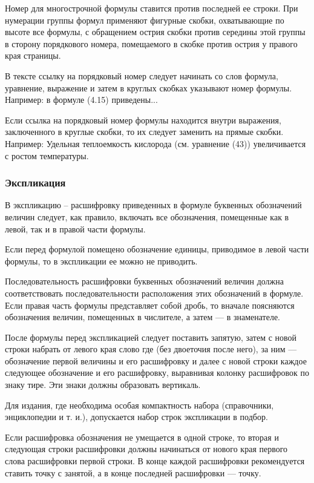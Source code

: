Номер для многострочной формулы ставится против последней ее строки. При нумерации группы формул применяют фигурные скобки, охваты­вающие по высоте все формулы, с обращением острия скобки против середины этой группы в сторону порядкового номера, помещаемого в скобке против острия у правого края страницы. 

В тексте ссылку на порядковый номер следует начинать со слов фор­мула, уравнение, выражение и затем в круглых скобках указывают номер формулы. Например: в формуле (4.15) приведены...

Если ссылка на порядковый номер формулы находится внутри выра­жения, заключенного в круглые скобки, то их следует заменить на прямые скобки. Например: Удельная теплоемкость кислорода (см. уравнение (43)) увеличивается с ростом температуры.

\subsubsection{Экспликация}
В экспликацию -- расшифровку приведенных в формуле буквенных обозначений величин следует, как правило, включать все обозначения, помещенные как в левой, так и в правой части формулы.

Если перед формулой помещено обозначение единицы, приво­димое в левой части формулы, то в экспликации ее можно не приводить.

Последовательность расшифровки буквенных обозначений величин должна соответствовать последовательности расположения этих обозначений в формуле. Если правая часть формулы представляет собой дробь, то вначале поясняются обозначения величин, помещенных в числителе, а затем — в знаменателе.

После формулы перед экспликацией следует поставить запятую, затем с новой строки набрать от левого края слово где (без двоеточия после него), за ним — обозначение первой величины и его расшифровку и далее с новой строки каждое следующее обозначение и его расшифровку, выравни­вая колонку расшифровок по знаку тире. Эти знаки должны образовать вер­тикаль.

Для издания, где необходима особая компактность набора (справочники, энциклопедии и т. и.), допускается набор строк экспликации в подбор.

Если расшифровка обозначения не умещается в одной строке, то вто­рая и следующая строки расшифровки должны начинаться от нового края первого слова расшифровки первой строки. В конце каждой расшифровки рекомендуется ставить точку с занятой, а в конце последней расшифровки — точку.

